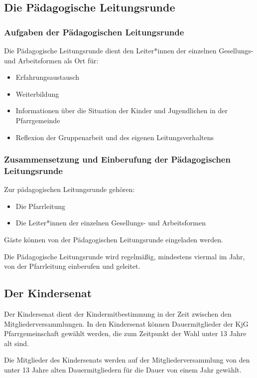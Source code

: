 \documentclass[12pt]{report}
\begin{document}
\begin{flushleft}
\subsection{Die Pädagogische Leitungsrunde}

\subsubsection{Aufgaben der Pädagogischen Leitungsrunde}
Die Pädagogische Leitungsrunde dient den Leiter*innen der einzelnen Gesellungs- und Arbeitsformen als Ort für:
\begin{itemize}
  \item Erfahrungsaustausch
  \item Weiterbildung
  \item Informationen über die Situation der Kinder und Jugendlichen in der Pfarrgemeinde
  \item Reflexion der Gruppenarbeit und des eigenen Leitungsverhaltens
\end{itemize}

\subsubsection{Zusammensetzung und Einberufung der Pädagogischen Leitungsrunde}
Zur pädagogischen Leitungsrunde gehören:
\begin{itemize}
  \item Die Pfarrleitung
  \item Die Leiter*innen der einzelnen Gesellungs- und Arbeitsformen
\end{itemize}

Gäste können von der Pädagogischen Leitungsrunde eingeladen werden.

Die Pädagogische Leitungsrunde wird regelmäßig, mindestens viermal im Jahr,
von der Pfarrleitung einberufen und geleitet.

\subsection{Der Kindersenat}
Der Kindersenat dient der Kindermitbestimmung in der Zeit zwischen den Mitgliederversammlungen.
In den Kindersenat können Dauermitglieder der KjG Pfarrgemeinschaft gewählt werden,
die zum Zeitpunkt der Wahl unter 13 Jahre alt sind.

Die Mitglieder des Kindersenats werden auf der Mitgliederversammlung von den unter 13 Jahre alten
Dauermitgliedern für die Dauer von einem Jahr gewählt.


\end{flushleft}
\end{document}
